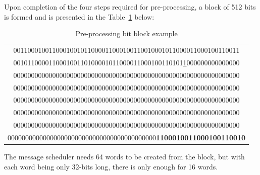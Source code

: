         Upon completion of the four steps required for pre-processing, a block of 512 bits is formed and is presented in the Table~\ref{table:Pre-processing bit block example} below:
        \begin{table}[h]
            
            \caption{Pre-processing bit block example}
            \label{table:Pre-processing bit block example}
            \begin{center}
            \begin{tabular}{|c|}
             \hline     
             0011000100110001001011000011000100110010001011000011000100110011 \\
             001011000011000100110100001011000011000100110101\underline{1}000000000000000 \\
             0000000000000000000000000000000000000000000000000000000000000000 \\
             0000000000000000000000000000000000000000000000000000000000000000 \\
             0000000000000000000000000000000000000000000000000000000000000000 \\
             0000000000000000000000000000000000000000000000000000000000000000 \\
             0000000000000000000000000000000000000000000000000000000000000000 \\
             000000000000000000000000000000000000000000\textbf{1100010011000100110010} \\
             \hline
            \end{tabular}
            \end{center}
            
        \end{table}
        
        The message scheduler needs 64 words to be created from the block, but with each word being only 32-bits long, there is only enough for 16 words. 
        
